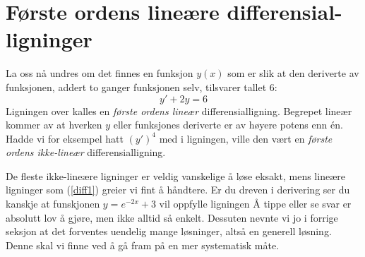\section[Første ordens lineære differensialligninger]{Første ordens lineære differensial- \\ ligninger\label{fode}}
La oss nå undres om det finnes en funksjon $ y(x) $ som er slik at den deriverte av funksjonen, addert to ganger funksjonen selv, tilsvarer tallet 6:
\begin{equation}
 y'+2y=6 \label{diff1}
\end{equation}
Ligningen over kalles en \textit{første ordens lineær} differensialligning. Begrepet lineær kommer av at hverken $ y $ eller funksjones deriverte er av høyere potens enn én. Hadde vi for eksempel hatt $ (y')^4 $ med i ligningen, ville den vært en \textit{første ordens ikke-lineær} differensialligning.\vsk

De fleste ikke-lineære ligninger er veldig vanskelige å løse eksakt, mens lineære ligninger som (\ref{diff1}) greier vi fint å håndtere. Er du dreven i derivering ser du kanskje at funskjonen ${y= e^{-2x}+3} $ vil oppfylle ligningen \vs
{}
Å tippe eller se svar er absolutt lov å gjøre, men ikke alltid så enkelt. Dessuten nevnte vi jo i forrige seksjon at det forventes uendelig mange løsninger, altså en generell løsning. Denne skal vi finne ved å gå fram på en mer systematisk måte.\vsk


